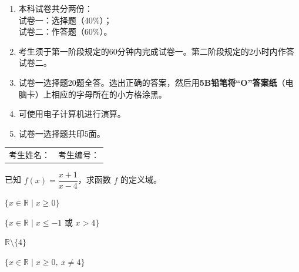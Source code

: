 \documentclass[12pt,a4paper]{exam-zh}
\begin{document}
\begin{enumerate}[label=\arabic*、,leftmargin=2em,itemsep=0.65em]
  \item 本科试卷共分两份：\\
  试卷一：选择题（40\%）；\\
  试卷二：作答题（60\%）。

  \item 考生须于第一阶段规定的60分钟内完成试卷一。第二阶段规定的2小时内作答试卷二。

  \item 试卷一选择题20题全答。选出正确的答案，然后用\textbf{5B铅笔将“O”答案纸}（电脑卡）上相应的字母所在的小方格涂黑。

  \item 可使用电子计算机进行演算。

  \item 试卷一选择题共印5面。
\end{enumerate}

\vspace{2.0em}

\begin{center}
  {\setlength{\fboxrule}{1.2pt}}
\end{center}

\vfill

\begin{tabular*}{\linewidth}{@{\extracolsep{\fill}}ll}
考生姓名：\underline{\hspace{4.2cm}} & 考生编号：\underline{\hspace{4.0cm}}
\end{tabular*}



\begin{question}
    已知 $f(x)=\dfrac{x+1}{x-4}$，求函数 $f$ 的定义域。\paren[C]
    \begin{choices}
        \item $\{x\in\mathbb{R}\mid x\ge 0\}$
        \item $\{x\in\mathbb{R}\mid x\le -1\text{ 或 }x>4\}$
        \item $\mathbb{R}\setminus\{4\}$
        \item $\{x\in\mathbb{R}\mid x\ge 0,\ x\ne 4\}$
    \end{choices}
\end{question}
\end{document}
